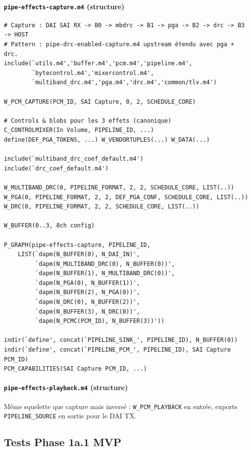 \documentclass[11pt,a4paper]{article}
\begin{document}
\paragraph{\texttt{pipe-effects-capture.m4} (structure)}
\begin{lstlisting}[language={}, basicstyle=\ttfamily\scriptsize]
# Capture : DAI SAI RX -> B0 -> mbdrc -> B1 -> pga -> B2 -> drc -> B3 -> HOST
# Pattern : pipe-drc-enabled-capture.m4 upstream étendu avec pga + drc.
include(`utils.m4','buffer.m4','pcm.m4','pipeline.m4',
        `bytecontrol.m4','mixercontrol.m4',
        `multiband_drc.m4','pga.m4','drc.m4','common/tlv.m4')

W_PCM_CAPTURE(PCM_ID, SAI Capture, 0, 2, SCHEDULE_CORE)

# Controls & blobs pour les 3 effets (canonique)
C_CONTROLMIXER(In Volume, PIPELINE_ID, ...)
define(DEF_PGA_TOKENS, ...) W_VENDORTUPLES(...) W_DATA(...)

include(`multiband_drc_coef_default.m4')
include(`drc_coef_default.m4')

W_MULTIBAND_DRC(0, PIPELINE_FORMAT, 2, 2, SCHEDULE_CORE, LIST(..))
W_PGA(0, PIPELINE_FORMAT, 2, 2, DEF_PGA_CONF, SCHEDULE_CORE, LIST(..))
W_DRC(0, PIPELINE_FORMAT, 2, 2, SCHEDULE_CORE, LIST(..))

W_BUFFER(0..3, 8ch config)

P_GRAPH(pipe-effects-capture, PIPELINE_ID,
    LIST(`dapm(N_BUFFER(0), N_DAI_IN)',
         `dapm(N_MULTIBAND_DRC(0), N_BUFFER(0))',
         `dapm(N_BUFFER(1), N_MULTIBAND_DRC(0))',
         `dapm(N_PGA(0), N_BUFFER(1))',
         `dapm(N_BUFFER(2), N_PGA(0))',
         `dapm(N_DRC(0), N_BUFFER(2))',
         `dapm(N_BUFFER(3), N_DRC(0))',
         `dapm(N_PCMC(PCM_ID), N_BUFFER(3))'))

indir(`define', concat(`PIPELINE_SINK_', PIPELINE_ID), N_BUFFER(0))
indir(`define', concat(`PIPELINE_PCM_', PIPELINE_ID), SAI Capture PCM_ID)
PCM_CAPABILITIES(SAI Capture PCM_ID, ...)
\end{lstlisting}

\paragraph{\texttt{pipe-effects-playback.m4} (structure)}
Même squelette que capture mais inversé : \texttt{W\_PCM\_PLAYBACK} en entrée, exports \texttt{PIPELINE\_SOURCE} en sortie pour le DAI TX.

\subsection{Tests Phase 1a.1 MVP}
\end{document}
